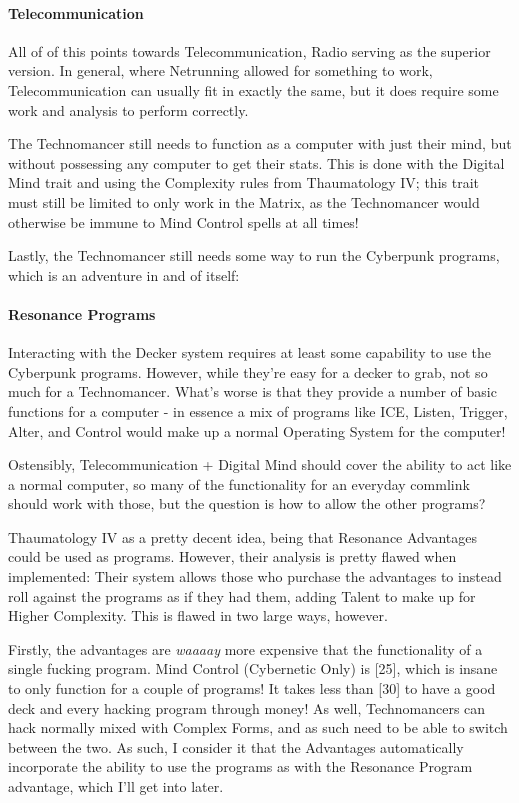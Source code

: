 \begin{multicols*}{2}
	\paragraph{Telecommunication}
	
	All of of this points towards Telecommunication, Radio serving as the superior version. In general, where Netrunning allowed for something to work, Telecommunication can usually fit in exactly the same, but it does require some work and analysis to perform correctly. 
	
	The Technomancer still needs to function as a computer with just their mind, but without possessing any computer to get their stats. This is done with the Digital Mind trait and using the Complexity rules from Thaumatology IV; this trait must still be limited to only work in the Matrix, as the Technomancer would otherwise be immune to Mind Control spells at all times!
	
	Lastly, the Technomancer still needs some way to run the Cyberpunk programs, which is an adventure in and of itself:
	
	\paragraph{Resonance Programs}
	
	Interacting with the Decker system requires at least some capability to use the Cyberpunk programs. However, while they're easy for a decker to grab, not so much for a Technomancer. What's worse is that they provide a number of basic functions for a computer - in essence a mix of programs like ICE, Listen, Trigger, Alter, and Control would make up a normal Operating System for the computer!
	
	Ostensibly, Telecommunication + Digital Mind should cover the ability to act like a normal computer, so many of the functionality for an everyday commlink should work with those, but the question is how to allow the other programs?
	
	Thaumatology IV as a pretty decent idea, being that Resonance Advantages could be used as programs. However, their analysis is pretty flawed when implemented: Their system allows those who purchase the advantages to instead roll against the programs as if they had them, adding Talent to make up for Higher Complexity. This is flawed in two large ways, however.
	
	Firstly, the advantages are \textit{waaaay} more expensive that the functionality of a single fucking program. Mind Control (Cybernetic Only) is [25], which is insane to only function for a couple of programs! It takes less than [30] to have a good deck and every hacking program through money! As well, Technomancers can hack normally mixed with Complex Forms, and as such need to be able to switch between the two. As such, I consider it that the Advantages automatically incorporate the ability to use the programs as with the Resonance Program advantage, which I'll get into later.
	

\end{multicols*}
